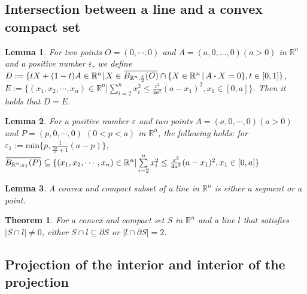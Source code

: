 \documentclass[a4paper]{article}
\newtheorem{thm}{Theorem}[subsection]
\newtheorem{lem}{Lemma}[subsection]
\newcommand{\overbar}[1]{\mkern 1.5mu\overline{\mkern-1.5mu#1\mkern-1.5mu}\mkern 1.5mu}
\theoremstyle{definition}
\begin{document}
\subsection{Intersection between a line and a convex compact set}

\begin{lem} For two points $O=(0,\cdots ,0)$ and $A=(a,0,...,0)(a>0)$ in $\mathbb{R}^n$ and a positive number $\varepsilon$, we define $D:=\{tX+(1-t)A \in\mathbb{R}^n|\, X\in \overbar{B_{\mathbb{R}^n,\frac{\varepsilon}{2}}(O)}\cap\{X\in \mathbb{R}^n\,|\,A\boldsymbol{\cdot}X=0\},t\in[0,1]\}$, $E:=\{(x_1,x_2,\cdots,x_n)\in \mathbb{R}^n|\sum\limits_{i=2}^n x_i^2 \le\frac{\varepsilon^2}{4a^2}(a-x_1)^2,x_1 \in [0,a]\}$. Then it holds that $D=E$.
\end{lem}

\begin{lem} For a positive number $\varepsilon$ and two points  $A=(a,0,\cdots,0)(a>0)$ and $P=(p,0,\cdots,0)$ $(0<p<a)$ in $\mathbb{R}^n$, the following holds: for $\varepsilon_1:=\textrm{min}\{p,\frac{1}{\frac{2a}{\varepsilon}+1}(a-p)\}$, $\overbar{B_{\mathbb{R}^n, \varepsilon_1}(P)}\subseteq\{(x_1,x_2,\cdots,x_n)\in\mathbb{R}^n|\sum\limits_{i=2}^n x_i^2 \le\frac{\varepsilon^2}{4a^2}(a-x_1)^2,x_1 \in [0,a]\}$
\end{lem}
\begin{lem} A convex and compact subset of a line in $\mathbb{R}^n$ is either a segment or a point.
\end{lem}

\begin{thm} For a convex and compact set $S$ in $\mathbb{R}^n$ and a line $l$ that satisfies $|S \cap l| \not= 0$, either $S \cap l \subseteq \partial S$ or $|l \cap \partial S|=2$.
\end{thm}

\subsection{Projection of the interior and interior of the projection}
\end{document}

